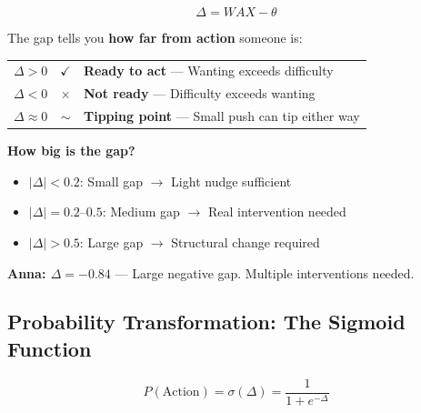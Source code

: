 \begin{equation}
\boxed{\Delta = WAX - \theta}
\label{eq:gap}
\end{equation}

\begin{intuition}
The gap tells you \textbf{how far from action} someone is:

\begin{center}
\begin{tabular}{rcp{7cm}}
$\Delta > 0$ & $\checkmark$ & \textbf{Ready to act} --- Wanting exceeds difficulty\\
$\Delta < 0$ & $\times$ & \textbf{Not ready} --- Difficulty exceeds wanting\\
$\Delta \approx 0$ & $\sim$ & \textbf{Tipping point} --- Small push can tip either way\\
\end{tabular}
\end{center}

\textbf{How big is the gap?}
\begin{itemize}
\item $|\Delta| < 0.2$: Small gap $\rightarrow$ Light nudge sufficient
\item $|\Delta| = 0.2$--$0.5$: Medium gap $\rightarrow$ Real intervention needed
\item $|\Delta| > 0.5$: Large gap $\rightarrow$ Structural change required
\end{itemize}

\textbf{Anna: $\Delta = -0.84$} --- Large negative gap. Multiple interventions needed.
\end{intuition}

\subsection{Probability Transformation: The Sigmoid Function}

\begin{equation}
\boxed{P(\text{Action}) = \sigma(\Delta) = \frac{1}{1 + e^{-\Delta}}}
\label{eq:prob-sigmoid}
\end{equation}

